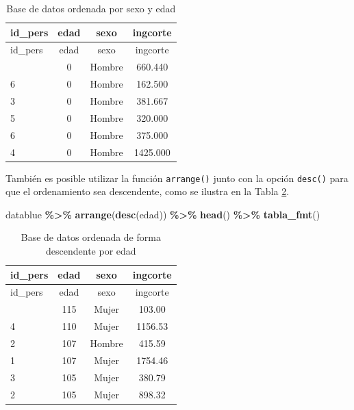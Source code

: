 \documentclass[
  spanish,
  12pt,
]{book}
\newenvironment{Shaded}{\begin{snugshade}}{\end{snugshade}}
\newcommand{\FunctionTok}[1]{\textcolor[rgb]{0.13,0.29,0.53}{\textbf{#1}}}
\newcommand{\NormalTok}[1]{#1}
\newcommand{\SpecialCharTok}[1]{\textcolor[rgb]{0.81,0.36,0.00}{\textbf{#1}}}
\begin{document}
\begin{longtable}[]{@{}lccc@{}}
\caption{\label{tab:tab-arrange-sexo-edad}Base de datos ordenada por sexo y edad}\tabularnewline
\toprule\noalign{}
id\_pers & edad & sexo & ingcorte \\
\midrule\noalign{}
\endfirsthead
\toprule\noalign{}
id\_pers & edad & sexo & ingcorte \\
\midrule\noalign{}
\endhead
\bottomrule\noalign{}
\endlastfoot
6 & 0 & Hombre & 660.440 \\
6 & 0 & Hombre & 162.500 \\
3 & 0 & Hombre & 381.667 \\
5 & 0 & Hombre & 320.000 \\
6 & 0 & Hombre & 375.000 \\
4 & 0 & Hombre & 1425.000 \\
\end{longtable}

También es posible utilizar la función \texttt{arrange()} junto con la opción \texttt{desc()} para que el ordenamiento sea descendente, como se ilustra en la Tabla \ref{tab:tab-arrange-edad-desc}.

\begin{Shaded}
\begin{Highlighting}[]
\NormalTok{datablue }\SpecialCharTok{\%\textgreater{}\%} \FunctionTok{arrange}\NormalTok{(}\FunctionTok{desc}\NormalTok{(edad)) }\SpecialCharTok{\%\textgreater{}\%} \FunctionTok{head}\NormalTok{() }\SpecialCharTok{\%\textgreater{}\%}
  \FunctionTok{tabla\_fmt}\NormalTok{()}
\end{Highlighting}
\end{Shaded}

\begin{longtable}[]{@{}lccc@{}}
\caption{\label{tab:tab-arrange-edad-desc}Base de datos ordenada de forma descendente por edad}\tabularnewline
\toprule\noalign{}
id\_pers & edad & sexo & ingcorte \\
\midrule\noalign{}
\endfirsthead
\toprule\noalign{}
id\_pers & edad & sexo & ingcorte \\
\midrule\noalign{}
\endhead
\bottomrule\noalign{}
\endlastfoot
2 & 115 & Mujer & 103.00 \\
4 & 110 & Mujer & 1156.53 \\
2 & 107 & Hombre & 415.59 \\
1 & 107 & Mujer & 1754.46 \\
3 & 105 & Mujer & 380.79 \\
2 & 105 & Mujer & 898.32 \\
\end{longtable}
\end{document}
